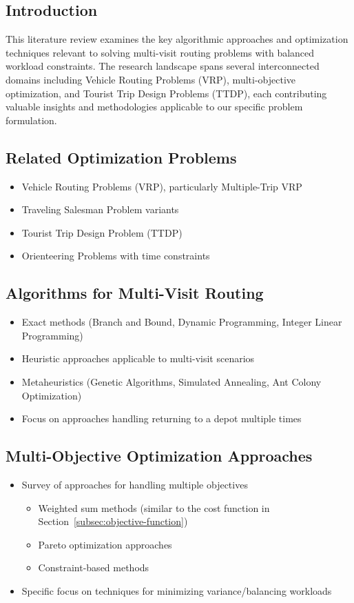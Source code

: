 \subsection{Introduction}
This literature review examines the key algorithmic approaches and optimization techniques relevant to solving
multi-visit routing problems with balanced workload constraints.
The research landscape spans several interconnected domains including Vehicle Routing Problems (VRP), multi-objective
optimization, and Tourist Trip Design Problems (TTDP), each contributing valuable insights and methodologies applicable
to our specific problem formulation.

\subsection{Related Optimization Problems}
\begin{itemize}
    \item Vehicle Routing Problems (VRP), particularly Multiple-Trip VRP
    \item Traveling Salesman Problem variants
    \item Tourist Trip Design Problem (TTDP)
    \item Orienteering Problems with time constraints
\end{itemize}

\subsection{Algorithms for Multi-Visit Routing}
\begin{itemize}
    \item Exact methods (Branch and Bound, Dynamic Programming, Integer Linear Programming)
    \item Heuristic approaches applicable to multi-visit scenarios
    \item Metaheuristics (Genetic Algorithms, Simulated Annealing, Ant Colony Optimization)
    \item Focus on approaches handling returning to a depot multiple times
\end{itemize}

\subsection{Multi-Objective Optimization Approaches}
\begin{itemize}
    \item Survey of approaches for handling multiple objectives
    \begin{itemize}
        \item Weighted sum methods (similar to the cost function in Section~\ref{subsec:objective-function})
        \item Pareto optimization approaches
        \item Constraint-based methods
    \end{itemize}
    \item Specific focus on techniques for minimizing variance/balancing workloads
\end{itemize}

